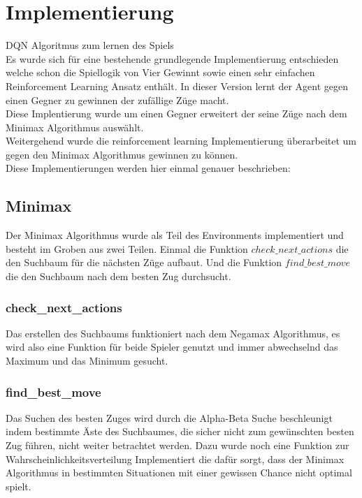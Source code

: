 \chapter{Implementierung}%

\label{cha:Implementierung}

\colorbox{red!30}{DQN Algoritmus zum lernen des Spiels}\\

Es wurde sich für eine bestehende grundlegende Implementierung entschieden welche schon die Spiellogik von Vier Gewinnt sowie einen sehr einfachen Reinforcement Learning Ansatz enthält. In dieser Version lernt der Agent gegen einen Gegner zu gewinnen der zufällige Züge macht.\\
Diese Implentierung wurde um einen Gegner erweitert der seine Züge nach dem Minimax Algorithmus auswählt.\\
Weitergehend wurde die reinforcement learning Implementierung überarbeitet um gegen den Minimax Algorithmus gewinnen zu können.\\
Diese Implementierungen werden hier einmal genauer beschrieben:\\

\section{Minimax}
Der Minimax Algorithmus wurde als Teil des Environments implementiert und besteht im Groben aus zwei Teilen. Einmal die Funktion $check\_next\_actions$ die den Suchbaum für die nächsten Züge aufbaut. Und die Funktion $find\_best\_move$ die den Suchbaum nach dem besten Zug durchsucht.

\subsection{check\_next\_actions}
Das erstellen des Suchbaums funktioniert nach dem Negamax Algorithmus, es wird also eine Funktion für beide Spieler genutzt und immer abwechselnd das Maximum und das Minimum gesucht.

\subsection{find\_best\_move}
Das Suchen des besten Zuges wird durch die Alpha-Beta Suche beschleunigt indem bestimmte Äste des Suchbaumes, die sicher nicht zum gewünschten besten Zug führen, nicht weiter betrachtet werden. Dazu wurde noch eine Funktion zur Wahrscheinlichkeitsverteilung Implementiert die dafür sorgt, dass der Minimax Algorithmus in bestimmten Situationen mit einer gewissen Chance nicht optimal spielt.

